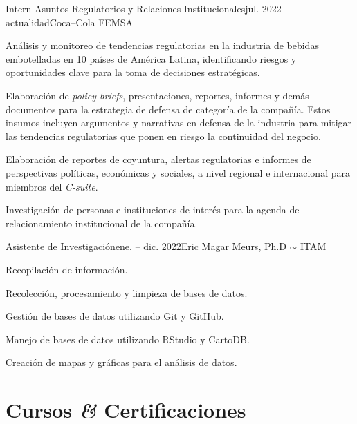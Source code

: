 \documentclass[letter]{resume}
\begin{document}
\begin{content}

\begin{position}{Intern Asuntos Regulatorios y Relaciones Institucionales}{jul. 2022 -- actualidad}{Coca--Cola FEMSA}{}{}
 \item Análisis y monitoreo de tendencias regulatorias en la industria de bebidas embotelladas en 10 países de América Latina, identificando riesgos y oportunidades clave para la toma de decisiones estratégicas.
 \item Elaboración de \emph{policy briefs}, presentaciones, reportes, informes y demás documentos para la estrategia de defensa de categoría de la compañía. Estos insumos incluyen argumentos y narrativas en defensa de la industria para mitigar las tendencias regulatorias que ponen en riesgo la continuidad del negocio.
 \item Elaboración de reportes de coyuntura, alertas regulatorias e informes de perspectivas políticas, económicas y sociales, a nivel regional e internacional para miembros del \emph{C-suite}.
 \item Investigación de personas e instituciones de interés para la agenda de relacionamiento institucional de la compañía.
\end{position}

\begin{position}{Asistente de Investigación}{ene. -- dic. 2022}{Eric Magar Meurs, Ph.D $\sim$ ITAM}{}{}
 \item Recopilación de información.
 \item Recolección, procesamiento y limpieza de bases de datos.
 \item Gestión de bases de datos utilizando Git y GitHub.
 \item Manejo de bases de datos utilizando RStudio y CartoDB.
 \item Creación de mapas y gráficas para el análisis de datos.
\end{position}
\vspace{-.1 \baselineskip}

\sectionlineskip
\end{content}


\section{Cursos \textbf{\em\&} Certificaciones}
\end{document}
